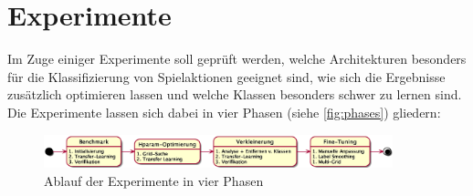 \section{Experimente}
\label{sec:experimente}

Im Zuge einiger Experimente soll geprüft werden, welche Architekturen besonders für die Klassifizierung von Spielaktionen geeignet sind, wie sich die Ergebnisse zusätzlich optimieren lassen und welche Klassen besonders schwer zu lernen sind.
Die Experimente lassen sich dabei in vier Phasen (siehe \autoref{fig:phases}) gliedern:

\begin{figure}[htbp!]
    \centering
    \includegraphics[width=0.9\textwidth, height=0.8\textwidth, keepaspectratio, interpolate]{fig/phases.eps}
    \caption{Ablauf der Experimente in vier Phasen}
    \label{fig:phases}
\end{figure}

